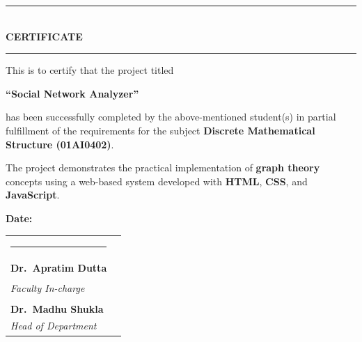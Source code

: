 \documentclass{article}
\begin{document}
\clearpage
\thispagestyle{empty}

\begin{center}
  {\color{PrimaryBlue}\rule{\textwidth}{2pt}}
  \vspace{4pt}\\
  {\color{PrimaryBlue}\fontsize{18}{22}\selectfont\bfseries CERTIFICATE}\\
  \vspace{4pt}
  {\color{AccentBlue}\rule{\textwidth}{1pt}}
\end{center}

\vspace{1.5cm}

\begin{mdframed}[
  linecolor=PrimaryBlue,
  linewidth=1.2pt,
  topline=true, bottomline=true,
  leftline=true, rightline=true,
  innerleftmargin=16pt, innerrightmargin=16pt,
  innertopmargin=16pt, innerbottommargin=16pt,
  backgroundcolor=LightGray
]
This is to certify that the project titled

\begin{center}
  {\Large\bfseries\color{PrimaryBlue}``Social Network Analyzer''}
\end{center}

has been successfully completed by the above-mentioned student(s) in partial fulfillment of the requirements for the subject \textbf{Discrete Mathematical Structure (01AI0402)}.

The project demonstrates the practical implementation of \textbf{graph theory} concepts using a web-based system developed with \textbf{HTML}, \textbf{CSS}, and \textbf{JavaScript}.
\end{mdframed}

\vspace{2cm}

\begin{center}
  \textbf{Date:}\;\underline{\hspace{3cm}}
\end{center}

\vspace{2cm}

\noindent
\begin{tabular}{p{} p{}}
  \centering
  \rule{5cm}{0.4pt}\\
  {\bfseries\color{PrimaryBlue}Dr.\ Apratim Dutta}\\
  \textit{Faculty In-charge}
  &
  \centering
  \rule{5cm}{0.4pt}\\
  {\bfseries\color{PrimaryBlue}Dr.\ Madhu Shukla}\\
  \textit{Head of Department}
\end{tabular}
\end{document}
